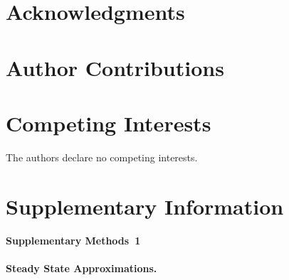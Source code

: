 \documentclass[10pt,a4paper]{article}
\begin{document}





%
%
%
%	
%
%



\section*{Acknowledgments}



\section*{Author Contributions}


\section*{Competing Interests}
The authors declare no competing interests.


\section*{Supplementary Information}

\paragraph*{Supplementary Methods~1}
\label{supp1}
{\bf Steady State Approximations.}\\
\end{document}
